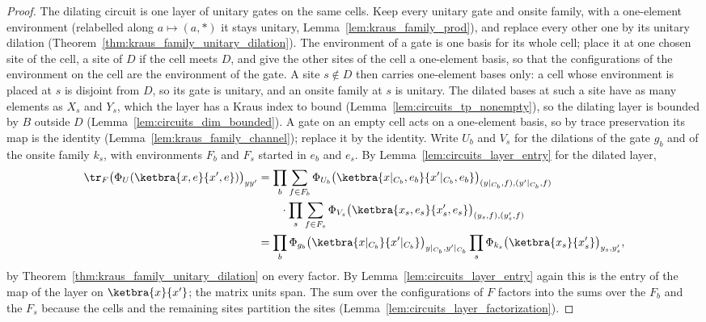 \begin{proof}\leanok
    The dilating circuit is one layer of unitary gates on the same cells. Keep every unitary
    gate and onsite family, with a one-element environment (relabelled along
    $a\mapsto(a,*)$ it stays unitary, Lemma~\ref{lem:kraus_family_prod}), and replace every other one by its
    unitary dilation (Theorem~\ref{thm:kraus_family_unitary_dilation}). The environment of a
    gate is one basis for its whole cell; place it at one chosen site of the cell, a site of
    $D$ if the cell meets $D$, and give the other sites of the cell a one-element basis, so that
    the configurations of the environment on the cell are the environment of the gate. A site
    $s\notin D$ then carries one-element bases only: a cell whose environment is placed at $s$
    is disjoint from $D$, so its gate is unitary, and an onsite family at $s$ is unitary. The
    dilated bases at such a site have as many elements as $X_s$ and $Y_s$, which the layer has
    a Kraus index to bound (Lemma~\ref{lem:circuits_tp_nonempty}), so the dilating layer is
    bounded by $B$ outside $D$ (Lemma~\ref{lem:circuits_dim_bounded}). A gate on an empty cell acts on a one-element basis, so
    by trace preservation its map is the identity (Lemma~\ref{lem:kraus_family_channel});
    replace it by the identity. Write
    $U_b$ and $V_s$ for the dilations of the gate $g_b$ and of the onsite family $k_s$, with
    environments $F_b$ and $F_s$ started in $e_b$ and $e_s$. By
    Lemma~\ref{lem:circuits_layer_entry} for the dilated layer,
    \begin{align}
        \tr_F\bigl(\Phi_U(\ketbra{x,e}{x',e})\bigr)_{yy'}
        &=\prod_b\sum_{f\in F_b}\Phi_{U_b}
            \bigl(\ketbra{x|_{C_b},e_b}{x'|_{C_b},e_b}\bigr)_{(y|_{C_b},f),(y'|_{C_b},f)}
        \notag\\
        &\qquad\cdot\prod_s\sum_{f\in F_s}\Phi_{V_s}
            \bigl(\ketbra{x_s,e_s}{x'_s,e_s}\bigr)_{(y_s,f),(y'_s,f)}
        \notag\\
        &=\prod_b\Phi_{g_b}\bigl(\ketbra{x|_{C_b}}{x'|_{C_b}}\bigr)_{y|_{C_b},y'|_{C_b}}
        \prod_s\Phi_{k_s}\bigl(\ketbra{x_s}{x'_s}\bigr)_{y_s,y'_s},
        \notag
    \end{align}
    by Theorem~\ref{thm:kraus_family_unitary_dilation} on every factor. By
    Lemma~\ref{lem:circuits_layer_entry} again this is the entry of the map of the layer on
    $\ketbra{x}{x'}$; the matrix units span. The sum over the configurations of $F$ factors
    into the sums over the $F_b$ and the $F_s$ because the cells and the remaining sites
    partition the sites (Lemma~\ref{lem:circuits_layer_factorization}).
\end{proof}

